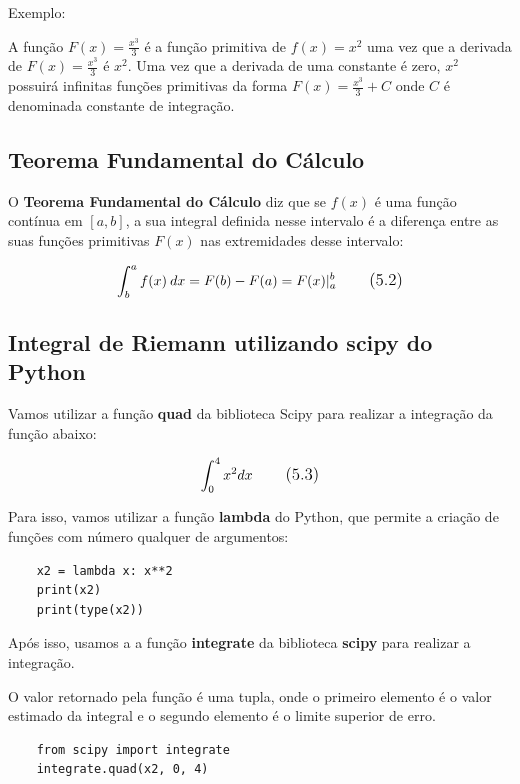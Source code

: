 Exemplo: 

A função $F(x) = \frac{x^3}{3}$ é a função primitiva de $f(x) = x^2$ uma vez que a derivada de $F(x) = \frac{x^3}{3}$ é $x^2$. Uma vez que a derivada de uma constante é zero, $x^2$ possuirá infinitas funções primitivas da forma $F(x) = \frac{x^3}{3} + C$ onde $C$ é denominada constante de integração.

\subsection{Teorema Fundamental do Cálculo}

O \textbf{Teorema Fundamental do Cálculo} diz que se $f(x)$ é uma função contínua em $[a,b]$, a sua integral definida nesse intervalo é a diferença entre as suas funções primitivas $F(x)$ nas extremidades desse intervalo:

\begin{equation}
\large \int_{b}^{a}f(x)\:dx = F(b) - F(a) = F(x)|^{b}_{a}
\tag{5.2}
\end{equation}

\subsection{Integral de Riemann utilizando scipy do Python}
Vamos utilizar a função \textbf{quad} da biblioteca Scipy para realizar a integração da função abaixo:

\begin{equation}
\large \int_{0}^{4}x^2dx
\tag{5.3}
\end{equation}

Para isso, vamos utilizar a função \textbf{lambda} do Python, que permite a criação de funções com número qualquer de argumentos:

\begin{verbatim}
	x2 = lambda x: x**2
	print(x2)
	print(type(x2))
\end{verbatim}

Após isso, usamos a a função \textbf{integrate} da biblioteca \textbf{scipy} para realizar a integração.

O valor retornado pela função é uma tupla, onde o primeiro elemento é o valor estimado da integral e o segundo elemento é o limite superior de erro.

\begin{verbatim}
	from scipy import integrate
	integrate.quad(x2, 0, 4)
\end{verbatim}

